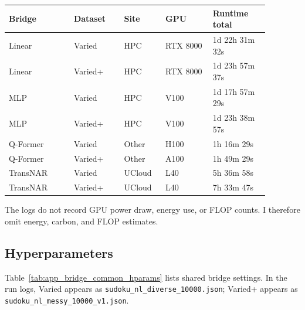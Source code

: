 \documentclass[11pt]{article}
\begin{document}
\begin{center}
\begin{minipage}{0.98\linewidth}
\footnotesize
\setlength{\tabcolsep}{2pt}
\label{tab:app_runtime_metadata}
\begin{tabular}{@{}L{0.22\linewidth}L{0.17\linewidth}L{0.14\linewidth}L{0.16\linewidth}L{0.19\linewidth}@{}}
\toprule
Bridge & Dataset & Site & GPU & Runtime total \\
\midrule
Linear & Varied & HPC & RTX 8000 & 1d 22h 31m 32s \\
Linear & Varied+ & HPC & RTX 8000 & 1d 23h 57m 37s \\
MLP & Varied & HPC & V100 & 1d 17h 57m 29s \\
MLP & Varied+ & HPC & V100 & 1d 23h 38m 57s \\
Q-Former & Varied & Other & H100 & 1h 16m 29s \\
Q-Former & Varied+ & Other & A100 & 1h 49m 29s \\
TransNAR & Varied & UCloud & L40 & 5h 36m 58s \\
TransNAR & Varied+ & UCloud & L40 & 7h 33m 47s \\
\bottomrule
\end{tabular}
\end{minipage}
\end{center}

The logs do not record GPU power draw, energy use, or FLOP counts.
I therefore omit energy, carbon, and FLOP estimates.

\subsection{Hyperparameters}
\label{app:hyperparameters}

Table~\ref{tab:app_bridge_common_hparams} lists shared bridge settings.
In the run logs, Varied appears as \texttt{sudoku\_nl\_diverse\_10000.json}; Varied+ appears as \texttt{sudoku\_nl\_messy\_10000\_v1.json}.
\end{document}

